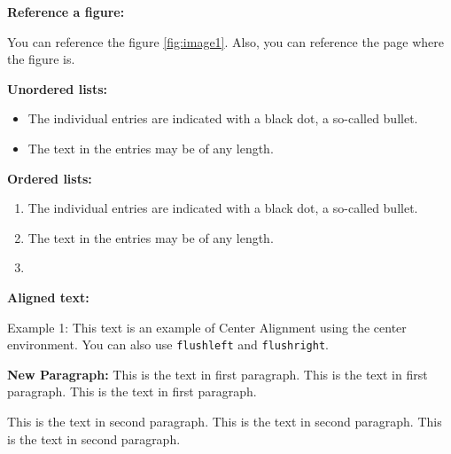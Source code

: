 \textbf{Reference a figure:}

You can reference the figure \ref{fig:image1}. Also, you can reference the page \pageref{fig:image1} where the figure is.

\textbf{Unordered lists:}

\begin{itemize}
  \item The individual entries are indicated with a black dot, a so-called bullet.
  \item The text in the entries may be of any length.
\end{itemize}

\textbf{Ordered lists:}

\begin{enumerate}
  \item The individual entries are indicated with a black dot, a so-called bullet.
  \item The text in the entries may be of any length.
  \item \blindtext
\end{enumerate}

\textbf{Aligned text:}
\begin{center}
  Example 1: This text is an example of Center Alignment using the center environment. You can also use \verb|flushleft| and \verb|flushright|.
\end{center}

\textbf{New Paragraph:}
This is the text in first paragraph. This is the text in first paragraph. This is the text in first paragraph. \par
This is the text in second paragraph. This is the text in second paragraph. This is the text in second paragraph.

